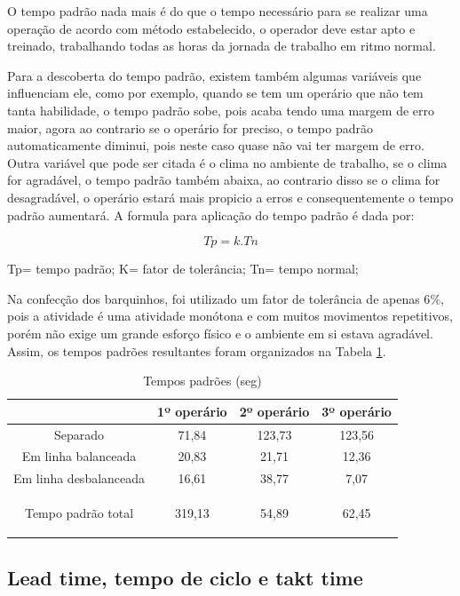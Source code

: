 \documentclass[
	12pt,				%
	oneside,			%
	a4paper,			%
	english,			%
	french,				%
	spanish,			%
	brazil,				%
	]{abntex2}
\begin{document}
O tempo padrão nada mais é do que o tempo necessário para se realizar uma operação de acordo com método estabelecido, o operador deve estar apto e treinado, trabalhando todas as horas da jornada de trabalho em ritmo normal.

Para a descoberta do tempo padrão, existem também algumas variáveis que influenciam ele, como por exemplo, quando se tem um operário que não tem tanta habilidade, o tempo padrão sobe, pois acaba tendo uma margem de erro maior, agora ao contrario se o operário for preciso, o tempo padrão automaticamente diminui, pois neste caso quase não vai ter margem de erro. Outra variável que pode ser citada é o clima no ambiente de trabalho, se o clima for agradável, o tempo padrão também abaixa, ao contrario disso se o clima for desagradável, o operário estará mais propicio a erros e consequentemente o tempo padrão aumentará.
A formula para aplicação do tempo padrão é dada por: 

\begin{equation}
Tp=k.Tn
\end{equation}

Tp= tempo padrão; K= fator de tolerância; Tn= tempo normal;

Na confecção dos barquinhos, foi utilizado um fator de tolerância de apenas 6$\%$, pois a atividade é uma atividade monótona e com muitos movimentos repetitivos, porém não exige um grande esforço físico e o ambiente em si estava agradável. Assim, os tempos padrões resultantes foram organizados na Tabela \ref{tab9}.

\begin{table}[H]
\centering
\caption{Tempos padrões (seg)}
\begin{tabular}{c|c|c|c}

	&1º operário	&		2º operário	&		3º operário		\\ \hline
Separado&	71,84	&		123,73	&		123,56		\\ \hline
Em linha balanceada&	20,83	&		21,71	&		12,36		\\ \hline
Em linha desbalanceada&	16,61&			38,77	&		7,07		\\ \hline
Tempo padrão total	&319,13			&54,89	&		62,45							
											
\label{tab9}
\end{tabular}	
\end{table}		

\subsection{Lead time, tempo de ciclo e takt time}
\end{document}
